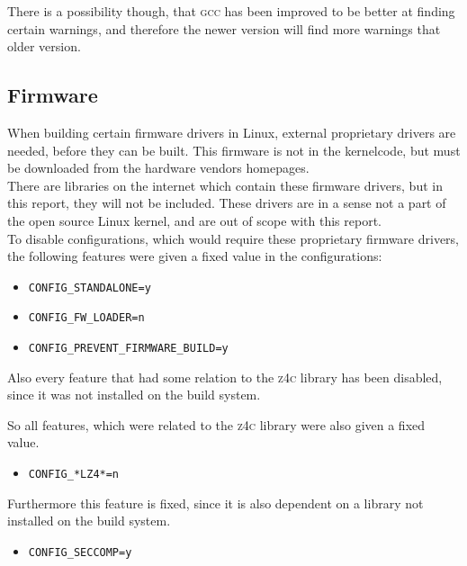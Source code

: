 \documentclass[a4paper,11pt]{report}
\newcommand{\textcode}[1]{\fboxsep=1pt\texttt{\colorbox{gray!20}{#1}}}
\begin{document}
There is a possibility though, that \textsc{gcc} has been improved to be better 
at finding certain warnings, and therefore the newer version will find more 
warnings that older version.



            \subsection{Firmware}
When building certain firmware drivers in Linux, external proprietary drivers 
are needed, before they can be built. This firmware is not in the kernelcode, 
but must be downloaded from the hardware vendors homepages.
\\

There are libraries on the internet which contain these firmware drivers, but 
in this report, they will not be included. These drivers are in a sense not a 
part of the open source Linux kernel, and are out of scope with this report.
\\

To disable configurations, which would require these proprietary firmware 
drivers, the following features were given a fixed value in the configurations:

\begin{itemize}
    \item \textcode{CONFIG\_STANDALONE=y}
    \item \textcode{CONFIG\_FW\_LOADER=n}
    \item \textcode{CONFIG\_PREVENT\_FIRMWARE\_BUILD=y}
\end{itemize}


Also every feature that had some relation to the \textsc{z4c} library has been 
disabled, since it was not installed on the build system.

So all features, which were related to the \textsc{z4c} library were also given 
a fixed value.

\begin{itemize}
    \item \textcode{CONFIG\_*LZ4*=n}
\end{itemize}


Furthermore this feature is fixed, since it is also dependent on a library not 
installed on the build system.

\begin{itemize}
    \item \textcode{CONFIG\_SECCOMP=y}
\end{itemize}
\end{document}
